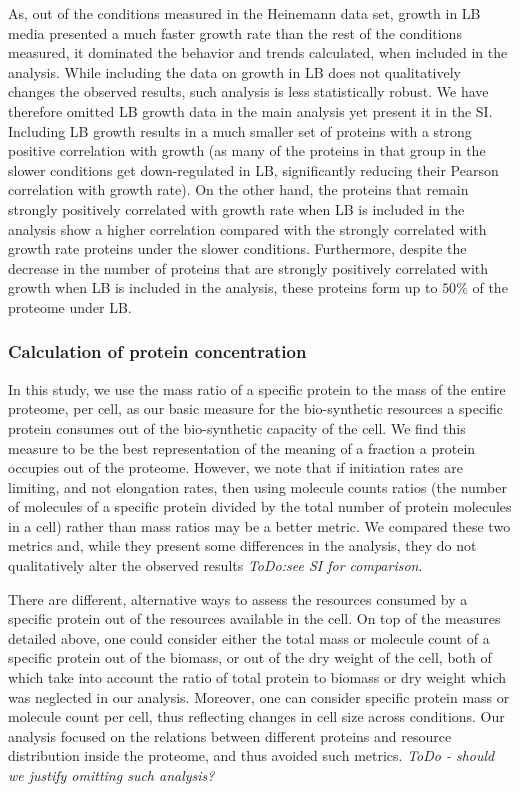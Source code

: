 \documentclass[notitlepage]{article}
\begin{document}
As, out of the conditions measured in the Heinemann data set, growth in LB media presented a much faster growth rate than the rest of the conditions measured, it dominated the behavior and trends calculated, when included in the analysis.
While including the data on growth in LB does not qualitatively changes the observed results, such analysis is less statistically robust.
We have therefore omitted LB growth data in the main analysis yet present it in the SI.
Including LB growth results in a much smaller set of proteins with a strong positive correlation with growth (as many of the proteins in that group in the slower conditions get down-regulated in LB, significantly reducing their Pearson correlation with growth rate).
On the other hand, the proteins that remain strongly positively correlated with growth rate when LB is included in the analysis show a higher correlation compared with the strongly correlated with growth rate proteins under the slower conditions.
Furthermore, despite the decrease in the number of proteins that are strongly positively correlated with growth when LB is included in the analysis, these proteins form up to $50\%$ of the proteome under LB.

\subsubsection{Calculation of protein concentration}
\label{protconc}
In this study, we use the mass ratio of a specific protein to the mass of the entire proteome, per cell, as our basic measure for the bio-synthetic resources a specific protein consumes out of the bio-synthetic capacity of the cell.
We find this measure to be the best representation of the meaning of a fraction a protein occupies out of the proteome.
However, we note that if initiation rates are limiting, and not elongation rates, then using molecule counts ratios (the number of molecules of a specific protein divided by the total number of protein molecules in a cell) rather than mass ratios may be a better metric.
We compared these two metrics and, while they present some differences in the analysis, they do not qualitatively alter the observed results \emph{ToDo:see SI for comparison}.

There are different, alternative ways to assess the resources consumed by a specific protein out of the resources available in the cell.
On top of the measures detailed above, one could consider either the total mass or molecule count of a specific protein out of the biomass, or out of the dry weight of the cell, both of which take into account the ratio of total protein to biomass or dry weight which was neglected in our analysis.
Moreover, one can consider specific protein mass or molecule count per cell, thus reflecting changes in cell size across conditions.
Our analysis focused on the relations between different proteins and resource distribution inside the proteome, and thus avoided such metrics.
\emph{ToDo - should we justify omitting such analysis?}
\end{document}
